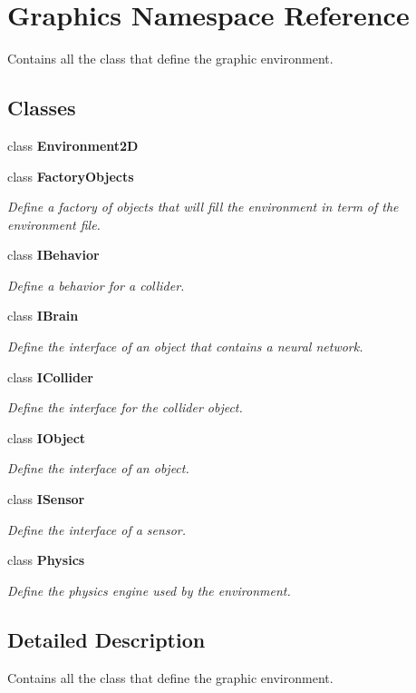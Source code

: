 \section{Graphics Namespace Reference}
\label{namespace_graphics}


Contains all the class that define the graphic environment.  


\subsection*{Classes}
\begin{DoxyCompactItemize}
\item 
class {\bf Environment2\+D}
\item 
class {\bf Factory\+Objects}
\begin{DoxyCompactList}\small\item\em Define a factory of objects that will fill the environment in term of the environment file. \end{DoxyCompactList}\item 
class {\bf I\+Behavior}
\begin{DoxyCompactList}\small\item\em Define a behavior for a collider. \end{DoxyCompactList}\item 
class {\bf I\+Brain}
\begin{DoxyCompactList}\small\item\em Define the interface of an object that contains a neural network. \end{DoxyCompactList}\item 
class {\bf I\+Collider}
\begin{DoxyCompactList}\small\item\em Define the interface for the collider object. \end{DoxyCompactList}\item 
class {\bf I\+Object}
\begin{DoxyCompactList}\small\item\em Define the interface of an object. \end{DoxyCompactList}\item 
class {\bf I\+Sensor}
\begin{DoxyCompactList}\small\item\em Define the interface of a sensor. \end{DoxyCompactList}\item 
class {\bf Physics}
\begin{DoxyCompactList}\small\item\em Define the physics engine used by the environment. \end{DoxyCompactList}\end{DoxyCompactItemize}


\subsection{Detailed Description}
Contains all the class that define the graphic environment. 